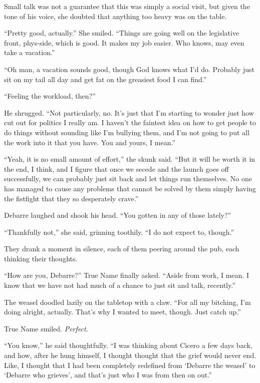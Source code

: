 Small talk was not a guarantee that this was simply a social visit, but given the tone of his voice, she doubted that anything too heavy was on the table.

``Pretty good, actually.'' She smiled. ``Things are going well on the legislative front, phys-side, which is good. It makes my job easier. Who knows, may even take a vacation.''

``Oh man, a vacation sounds good, though God knows what I'd do. Probably just sit on my tail all day and get fat on the greasiest food I can find.''

``Feeling the workload, then?''

He shrugged. ``Not particularly, no. It's just that I'm starting to wonder just how cut out for politics I really am. I haven't the faintest idea on how to get people to do things without sounding like I'm bullying them, and I'm not going to put all the work into it that you have. You and yours, I mean.''

``Yeah, it is no small amount of effort,'' the skunk said. ``But it will be worth it in the end, I think, and I figure that once we secede and the launch goes off successfully, we can probably just sit back and let things run themselves. No one has managed to cause any problems that cannot be solved by them simply having the fistfight that they so desperately crave.''

Debarre laughed and shook his head. ``You gotten in any of those lately?''

``Thankfully not,'' she said, grinning toothily. ``I do not expect to, though.''

They drank a moment in silence, each of them peering around the pub, each thinking their thoughts.

``How are you, Debarre?'' True Name finally asked. ``Aside from work, I mean. I know that we have not had much of a chance to just sit and talk, recently.''

The weasel doodled lazily on the tabletop with a claw. ``For all my bitching, I'm doing alright, actually. That's why I wanted to meet, though. Just catch up.''

True Name smiled. \emph{Perfect.}

``You know,'' he said thoughtfully. ``I was thinking about Cicero a few days back, and how, after he hung himself, I thought thought that the grief would never end. Like, I thought that I had been completely redefined from `Debarre the weasel' to `Debarre who grieves', and that's just who I was from then on out.''

